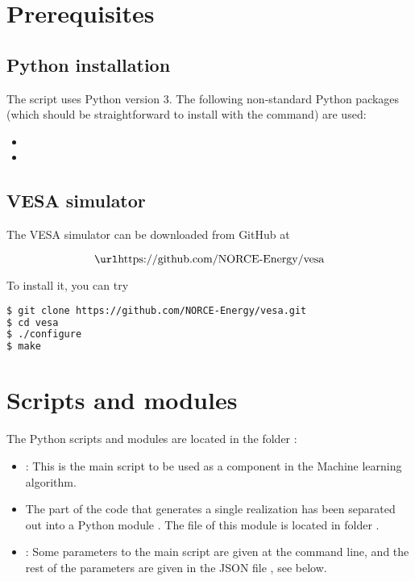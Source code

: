 \documentclass[11pt,a4paper]{amsart}
\begin{document}
\section{Prerequisites}
\subsection{Python installation}
The script uses Python version 3.
The following non-standard Python
packages (which should be straightforward to install with the \pythonPip{} 
\cite{pyt18:pip} command) are used:
\begin{itemize}
\item {}
\item {}
\end{itemize}
\subsection{VESA simulator}
The VESA simulator can be downloaded from GitHub at

\[ \text{\vesaGitHub{}} \]

To install it, you can try
\begin{lstlisting}[language=bash]
$ git clone https://github.com/NORCE-Energy/vesa.git
$ cd vesa
$ ./configure
$ make
\end{lstlisting}


\section{Scripts and modules}
The Python scripts and modules are located in the folder :
\begin{itemize}
\item \mainScriptKJ{} : This is the main script to be used as a component in the
  Machine learning algorithm.
\item The part of the code that generates a single realization has been
  separated out into a Python module . The file of
  this module is located in folder .
\item \jsonInputParamFile{} : Some parameters to the main script
  \mainScriptKJ{} are given at the command line, and the rest of the
  parameters are given in the JSON file \jsonInputParamFile{}, see below.
\end{itemize}
\end{document}
